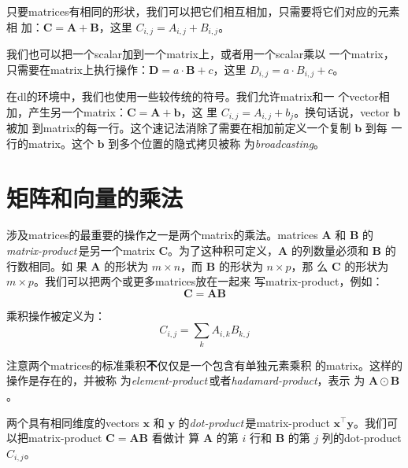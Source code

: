 只要\gls*{matrices}有相同的形状，我们可以把它们相互相加，只需要将它们对应的元素相
加：$\pmb{C} = \pmb{A} + \pmb{B}$，这里 $C_{i,j} = A_{i,j} + B_{i,j}$。

我们也可以把一个\gls*{scalar}加到一个\gls*{matrix}上，或者用一个\gls*{scalar}乘以
一个\gls*{matrix}，只需要在\gls*{matrix}上执行操作：$\pmb{D} = a \cdot \pmb{B} +
c$，这里 $D_{i,j} = a \cdot B_{i,j} + c$。

在\gls*{dl}的环境中，我们也使用一些较传统的符号。我们允许\gls*{matrix}和一
个\gls*{vector}相加，产生另一个\gls*{matrix}：$\pmb{C} = \pmb{A} + \pmb{b}$，这
里 $C_{i,j} = A_{i,j} + b_j$。换句话说，\gls*{vector} $\pmb{b}$ 被加
到\gls*{matrix}的每一行。这个速记法消除了需要在相加前定义一个复制 $\pmb{b}$ 到每
一行的\gls*{matrix}。这个 $\pmb{b}$ 到多个位置的隐式拷贝被称
为\emph{\gls{broadcasting}}。

\section{矩阵和向量的乘法}
\label{sec:multiplying_matrices_and_vectors}

涉及\gls*{matrices}的最重要的操作之一是两个\gls*{matrix}的乘法。\gls*{matrices}
$\pmb{A}$ 和 $\pmb{B}$ 的\emph{\gls{matrix-product}}\,是另一个\gls*{matrix}
$\pmb{C}$。为了这种积可定义，$\pmb{A}$ 的列数量必须和 $\pmb{B}$ 的行数相同。如
果 $\pmb{A}$ 的形状为 $m \times n$，而 $\pmb{B}$ 的形状为 $n \times p$，那
么 $\pmb{C}$
的形状为$m \times p$。我们可以把两个或更多\gls*{matrices}放在一起来
写\gls*{matrix-product}，例如：
\begin{equation}
  \pmb{C} = \pmb{A}\pmb{B}
  \label{eq:matrix_product}
\end{equation}

乘积操作被定义为：
\begin{equation}
  C_{i,j} = \sum_{k}A_{i,k}B_{k,j}
  \label{eq:product_operation}
\end{equation}

注意两个\gls*{matrices}的标准乘积\textbf{不}仅仅是一个包含有单独元素乘积
的\gls*{matrix}。这样的操作是存在的，并被称
为\emph{\gls{element-product}}\,或者\emph{\gls{hadamard-product}}，表示
为 $\pmb{A} \odot \pmb{B}$。

两个具有相同维度的\gls*{vectors}
$\pmb{x}$ 和 $\pmb{y}$ 的\emph{\gls{dot-product}}\,是\gls*{matrix-product}
$\pmb{x}^{\top}\pmb{y}$。我们可以把\gls*{matrix-product} $\pmb{C} =
\pmb{A}\pmb{B}$ 看做计
算 $\pmb{A}$ 的第 $i$ 行和 $\pmb{B}$ 的第 $j$ 列的\gls*{dot-product} $C_{i,j}$。

